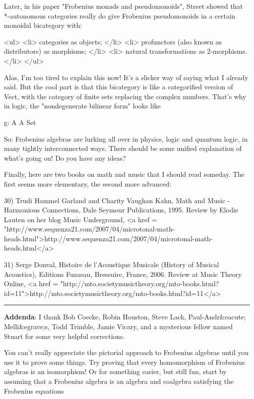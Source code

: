 Later, in his paper "Frobenius monads and pseudomonoids", Street 
showed that *-autonomous categories really do give Frobenius 
pseudomonoids in a certain monoidal bicategory with:

<ul>
<li>
categories as objects;
</li>
<li>
profunctors (also known as distributors) as morphisms;
</li>
<li>
natural transformations as 2-morphisms.
</li>
</ul>

Alas, I'm too tired to explain this now!  It's a slicker way of saying
what I already said.  But the cool part is that this bicategory is
like a categorified version of Vect, with the category of finite sets
replacing the complex numbers.  That's why in logic, the
"nondegenerate bilinear form" looks like

g: A \times  A \to  Set

So: Frobenius algebras are lurking all over in physics, logic
and quantum logic, in many tightly interconnected ways.  There 
should be some unified explanation of what's going on!  Do you have 
any ideas?

Finally, here are two books on math and music that I should read
someday.  The first seems more elementary, the second more advanced:

30) Trudi Hammel Garland and Charity Vaughan Kahn, Math and Music -
Harmonious Connections, Dale Seymour Publications, 1995.  Review 
by Elodie Lauten on her blog Music Underground, 
<a href = "http://www.sequenza21.com/2007/04/microtonal-math-heads.html">http://www.sequenza21.com/2007/04/microtonal-math-heads.html</a>

31) Serge Donval, Histoire de l'Acoustique Musicale (History of 
Musical Acoustics), Editions Fuzaeau, Bressuire, France, 2006.
Review at Music Theory Online, 
<a href = "http://mto.societymusictheory.org/mto-books.html?id=11">http://mto.societymusictheory.org/mto-books.html?id=11</a>

\par\noindent\rule{\textwidth}{0.4pt}
 
\textbf{Addenda}: I thank Bob Coecke, Robin Houston, Steve Lack,
Paul-Andr&eacute; Melli&egrave;s,
Todd Trimble, Jamie Vicary, and a mysterious fellow named Stuart for
some very helpful corrections.

You can't really appreciate the pictorial approach to Frobenius
algebras until you use it to prove some things.  Try proving that 
every homomorphism of Frobenius algebras is an isomorphism!  Or
for something easier, but still fun, start by assuming
that a Frobenius algebra is an algebra and coalgebra satisfying
the Frobenius equations

